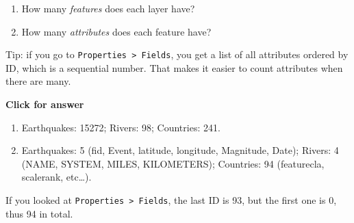 \documentclass[
  letterpaper,
  DIV=11,
  numbers=noendperiod]{scrreprt}
\begin{document}
\begin{tcolorbox}[enhanced jigsaw, breakable, toptitle=1mm, colback=white, left=2mm, leftrule=.75mm, titlerule=0mm, colframe=quarto-callout-important-color-frame, opacityback=0, title=\textcolor{quarto-callout-important-color}{\faExclamation}\hspace{0.5em}{Stop and Think}, toprule=.15mm, opacitybacktitle=0.6, bottomtitle=1mm, colbacktitle=quarto-callout-important-color!10!white, bottomrule=.15mm, coltitle=black, rightrule=.15mm, arc=.35mm]

\begin{enumerate}
\def\labelenumi{\alph{enumi})}
\item
  How many \emph{features} does each layer have?
\item
  How many \emph{attributes} does each feature have?
\end{enumerate}

Tip: if you go to \texttt{Properties\ \textgreater{}\ Fields}, you get a
list of all attributes ordered by ID, which is a sequential number. That
makes it easier to count attributes when there are many.

\end{tcolorbox}

\begin{tcolorbox}[enhanced jigsaw, leftrule=.75mm, colframe=quarto-callout-important-color-frame, breakable, toprule=.15mm, bottomrule=.15mm, arc=.35mm, rightrule=.15mm, opacityback=0, colback=white, left=2mm]

\vspace{-3mm}\textbf{Click for answer}\vspace{3mm}

\begin{enumerate}
\def\labelenumi{\alph{enumi})}
\item
  Earthquakes: 15272; Rivers: 98; Countries: 241.
\item
  Earthquakes: 5 (fid, Event, latitude, longitude, Magnitude, Date);
  Rivers: 4 (NAME, SYSTEM, MILES, KILOMETERS); Countries: 94
  (featurecla, scalerank, etc\ldots).
\end{enumerate}

If you looked at \texttt{Properties\ \textgreater{}\ Fields}, the last
ID is 93, but the first one is 0, thus 94 in total.

\end{tcolorbox}
\end{document}
